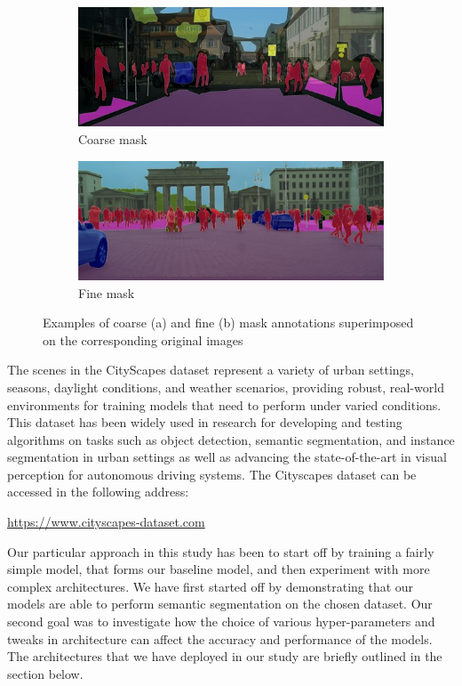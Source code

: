 \begin{figure}[ht]
    \centering
    \begin{subfigure}{0.45\textwidth}
        \centering
        \includegraphics[width=\linewidth]{coarse_example.jpg}
        \caption{Coarse mask}
        \label{fig:sub1}
    \end{subfigure}\hfill
    \begin{subfigure}{0.45\textwidth}
        \centering
        \includegraphics[width=\linewidth]{fine_example.jpg}
        \caption{Fine mask}
        \label{fig:sub2}
    \end{subfigure}
    \caption{Examples of coarse (a) and fine (b) mask annotations superimposed on the corresponding original images}
    \label{fig:cityscapes}
\end{figure}

The scenes in the CityScapes dataset represent a variety of urban settings, seasons, daylight conditions, and weather scenarios, providing robust, real-world environments for training models that need to perform under varied conditions. This dataset has been widely used in research for developing and testing algorithms on tasks such as object detection, semantic segmentation, and instance segmentation in urban settings as well as advancing the state-of-the-art in visual perception for autonomous driving systems. The Cityscapes dataset can be accessed in the following address:
\begin{center}
\url{https://www.cityscapes-dataset.com}
\end{center}
Our particular approach in this study has been to start off by training a fairly simple model, that forms our baseline model, and then experiment with more complex architectures. We have first started off by demonstrating that our models are able to perform semantic segmentation on the chosen dataset. Our second goal was to investigate how the choice of various hyper-parameters and tweaks in architecture can affect the accuracy and performance of the models. The architectures that we have deployed in our study are briefly outlined in the section below.
